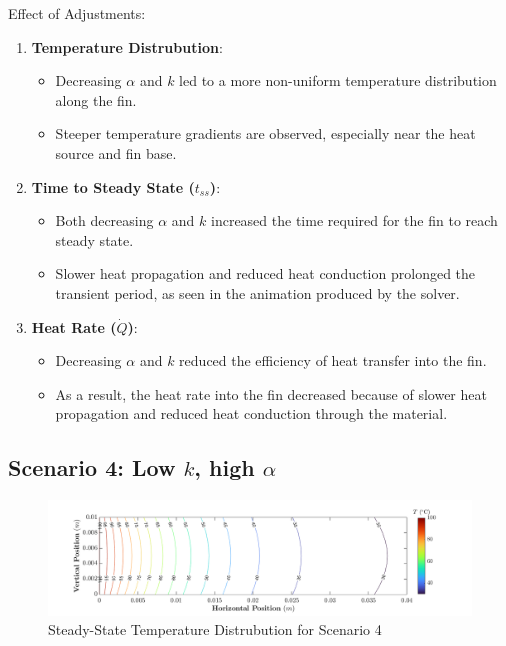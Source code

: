 \documentclass{article}
\begin{document}
Effect of Adjustments:
\begin{enumerate}
    \item \textbf{Temperature Distrubution}:
        \begin{itemize}
            \item Decreasing $\alpha$ and $k$ led to a more non-uniform temperature distribution along the fin.
            \item Steeper temperature gradients are observed, especially near the heat source and fin base.
        \end{itemize}
    \item \textbf{Time to Steady State ($t_{ss}$)}:
        \begin{itemize}
            \item Both decreasing $\alpha$ and $k$ increased the time required for the fin to reach steady state.
            \item Slower heat propagation and reduced heat conduction prolonged the transient period, as seen in the animation produced by the solver.
        \end{itemize}
    \item \textbf{Heat Rate ($\dot{Q}$)}:
        \begin{itemize}
            \item Decreasing $\alpha$ and $k$ reduced the efficiency of heat transfer into the fin.
            \item As a result, the heat rate into the fin decreased because of slower heat propagation and reduced heat conduction through the material.
        \end{itemize}
\end{enumerate}

\pagebreak

\subsection{Scenario 4: Low $k$, high $\alpha$}

\begin{figure}[h]
    \centering
    \includegraphics[width=1\textwidth]{fig/contour4.png}
    \caption{Steady-State Temperature Distrubution for Scenario 4}
    \label{fig: Plot4}
\end{figure}
\end{document}
